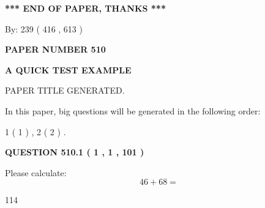 \documentclass[12pt]{article}
\begin{document}
   
   
   
\vspace{1.0in} 
{\textbf{\large{ *** END OF PAPER, THANKS *** }}} 
   
   
\hspace{1.0in} By: 
 239 ( 416 ,  613 )
   
   
   
   
\newpage 
\setcounter{page}{ 
   510001 } 
   
   
   
   
 {\textbf{ \Large{ PAPER NUMBER  510  }}}
   
   
\vspace{0.2in}
   
   
   
   
   
   
   
   
 \vspace{0.2in}
{\LARGE {\textbf{ A QUICK TEST EXAMPLE}}}
   
   
 PAPER TITLE GENERATED.
   
   
   
\vspace{0.2in}
   
In this paper, big questions will be generated in the following order: 
   
   
   1 ( 1 )
 ,
   2 ( 2 )
 .
  
\vspace{0.2in}
  
{\textbf{\Large{QUESTION
510.1 
 ( 1 , 1 , 101 )
}}}
  
  
 
Please calculate:
\begin{equation}
46 +  %
68 = \nonumber
\end{equation}
 
 
 
\noindent{}
 
 

114
 
 
\noindent{}
 
 

 
 
 
\noindent{}
 
\end{document}
